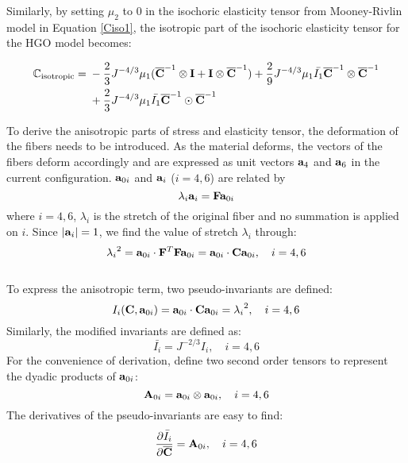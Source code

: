 Similarly, by setting $\mu_2$ to $0$ in the isochoric elasticity tensor from Mooney-Rivlin model in Equation \ref{Ciso1}, the isotropic part of the isochoric elasticity tensor for the HGO model becomes:

\begin{equation} \label{Ciso32}
\begin{split}
\mathbb{C}_\mathrm{isotropic} = {}&
- \frac{2}{3}J^{-4/3}\mu_1({\overline{\bold{C}}}^{-1} \otimes \bold{I} + \bold{I} \otimes {\overline{\bold{C}}}^{-1}) 
+
\frac{2}{9}J^{-4/3}\mu_1\bar{I_1}  {\overline{\bold{C}}}^{-1} \otimes {\overline{\bold{C}}}^{-1} \\
&+ \frac{2}{3}J^{-4/3} \mu_1\bar{I_1} {\overline{\bold{C}}}^{-1} \odot {\overline{\bold{C}}}^{-1} 
\end{split}
\end{equation}

To derive the anisotropic parts of stress and elasticity tensor, the deformation of the fibers needs to be introduced. As the material deforms, the vectors of the fibers deform accordingly and are expressed as unit vectors $\bold{a}_4$ and $\bold{a}_6$ in the current configuration. $\bold{a}_{0i}$ and $\bold{a}_{i}$ ($i = 4, 6$) are related by 
\begin{equation} \label{vector}
\lambda_i\bold{a}_i = \bold{F}\bold{a}_{0i}
\end{equation} 
where $i = 4, 6$, $\lambda_i$ is the stretch of the original fiber and no summation is applied on $i$.
Since $|\bold{a}_i| = 1$, we find the value of stretch $\lambda_i$ through:
\begin{equation}
{\lambda_i}^2 = \bold{a}_{0i} \cdot \bold{F}^T\bold{F}\bold{a}_{0i} = \bold{a}_{0i} \cdot \bold{C}\bold{a}_{0i}, \quad i = 4, 6
\end{equation}
\\
To express the anisotropic term, two pseudo-invariants are defined:
\begin{equation} \label{pseudo-invariants}
I_i(\bold{C}, \bold{a}_{0i}) = \bold{a}_{0i} \cdot \bold{C}\bold{a}_{0i} = {\lambda_i}^2, \quad i = 4, 6
\end{equation}
Similarly, the modified invariants are defined as:
\begin{equation}
\bar{I_i} = J^{-2/3}I_i, \quad i = 4, 6
\end{equation}
For the convenience of derivation, define two second order tensors to represent the dyadic products of $\bold{a}_{0i}$:
\begin{equation} \label{A0i}
\bold{A}_{0i} = \bold{a}_{0i} \otimes \bold{a}_{0i}, \quad i = 4, 6
\end{equation}
The derivatives of the pseudo-invariants are easy to find:
\begin{equation} \label{helper1}
\frac{\partial\bar I_i}{\partial \overline{\bold{C}}} = \bold{A}_{0i}, \quad i = 4, 6
\end{equation}


